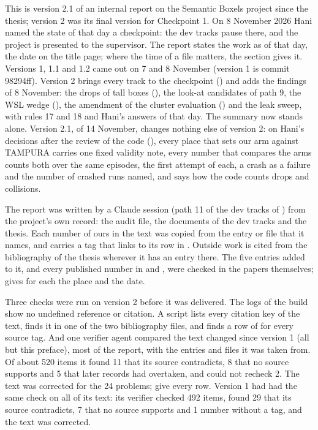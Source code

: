 
\begin{preface}
This is version 2.1 of an internal report on the Semantic Boxels project since the
thesis; version 2 was its final version for Checkpoint 1. On 8 November 2026 Hani named the state
of that day a checkpoint: the dev tracks pause there, and the project is presented to the
supervisor. The report states the work as of that day, the date on the title page; where
the time of a file matters, the section gives it. Versions 1, 1.1 and 1.2 came out on 7
and 8 November (version 1 is commit 98294ff). Version 2 brings every track to the
checkpoint () and adds the findings of 8 November: the drops of tall
boxes (), the look-at candidates of path 9, the WSL wedge (), the
amendment of the cluster evaluation () and the leak sweep, with rules 17 and 18
and Hani's answers of that day. The summary now stands alone. Version 2.1, of 14
November, changes nothing else of version 2: on Hani's decisions after the review of
the code (), every place that sets our arm against TAMPURA
carries one fixed validity note, every number that compares the arms counts both over
the same episodes, the first attempt of each, a crash as a failure and the number of
crashed runs named, and  says how
the code counts drops and collisions.

The report was written by a Claude session (path 11 of the dev tracks of
) from the project's own record: the audit file, the documents of the dev
tracks and the thesis. Each number of ours in the text was copied from the entry or file
that it names, and carries a tag that links to its row in
. Outside work is cited from the bibliography of the thesis
wherever it has an entry there. The five entries added to it, and every published number
in  and , were checked in the papers
themselves;  gives for each the place and the date.

Three checks were run on version 2 before it was delivered. The logs of the build show
no undefined reference or citation. A script lists every citation key of the text, finds
it in one of the two bibliography files, and finds a row of
 for every source tag. And one verifier agent compared the
text changed since version 1 (all but this preface), most of the report, with the entries and files it
was taken from. Of about 520 items it found 11 that its source contradicts, 8 that no source supports and 5 that later records had overtaken, and could not recheck 2. The text was corrected for the 24 problems;  give every row.
Version 1 had had the same check on all of its text: its verifier checked 492
items, found 29 that its source contradicts, 7 that no source supports and 1 number
without a tag, and the text was corrected.


\end{preface}
